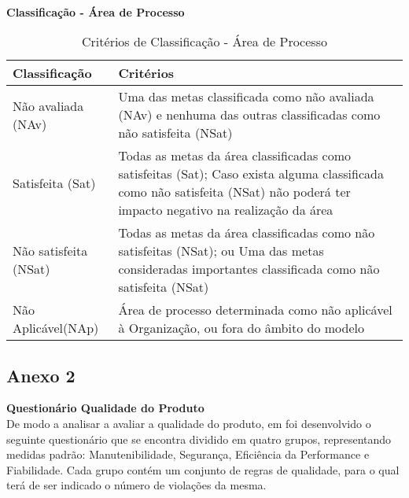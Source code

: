 \documentclass[openany,10pt,a4paper]{article}
\begin{document}
\begin{appendix}
\begin{table}[h]
\end{table}
\\
\begin{table}[h]
	\textbf{Classificação - Área de Processo}
		\centering
		\caption{Critérios de Classificação - Área de Processo}
		\begin{tabular}{p{5in}p{1in}}		
			\toprule
			\textbf{Classificação}  & \textbf{Critérios}\\ 
			\midrule
			Não avaliada (NAv) & Uma das metas classificada como não avaliada (NAv) e nenhuma das
			outras classificadas como não satisfeita (NSat) \\
			\midrule
			Satisfeita (Sat) & Todas as metas da área classificadas como satisfeitas (Sat);
			Caso exista alguma classificada como não satisfeita (NSat) não poderá
			ter impacto negativo na realização da área \\
			\midrule
			Não satisfeita (NSat) & Todas as metas da área classificadas como não satisfeitas (NSat); ou
			Uma das metas consideradas importantes classificada como não
			satisfeita (NSat) \\
			\midrule
			Não Aplicável(NAp) & Área de processo determinada como não aplicável à Organização, ou
			fora do âmbito do modelo \\
			\bottomrule
		\end{tabular} 
\end{table}


\subsection{Anexo 2}
\textbf{Questionário Qualidade do Produto}\\
De modo a analisar a avaliar a qualidade do produto, em foi desenvolvido o seguinte questionário que se encontra dividido em quatro grupos, representando medidas padrão: Manutenibilidade, Segurança, Eficiência da Performance e Fiabilidade.
Cada grupo contém um conjunto de regras de qualidade, para o qual terá de ser indicado o número de violações da mesma.


\end{appendix}
\end{document}
